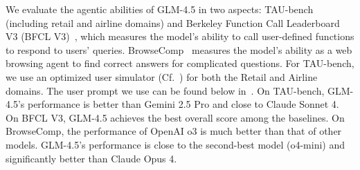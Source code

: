We evaluate the agentic abilities of GLM-4.5 in two aspects: TAU-bench~\cite{yao2024tau} (including retail and airline domains) and Berkeley Function Call Leaderboard V3 (BFCL V3)~\cite{patil2025bfcl}, which measures the model's ability to call user-defined functions to respond to users' queries. BrowseComp~\cite{wei2025browsecomp} measures the model's ability as a web browsing agent to find correct answers for complicated questions. For TAU-bench, we use an optimized user simulator (Cf.~) for both the Retail and Airline domains. The user prompt we use can be found below in~. 
On TAU-bench, GLM-4.5's performance is better than Gemini 2.5 Pro and close to Claude Sonnet 4. On BFCL V3, GLM-4.5 achieves the best overall score among the baselines. On BrowseComp, the performance of OpenAI o3 is much better than that of other models. GLM-4.5's performance is close to the second-best model (o4-mini) and significantly better than Claude Opus 4.

